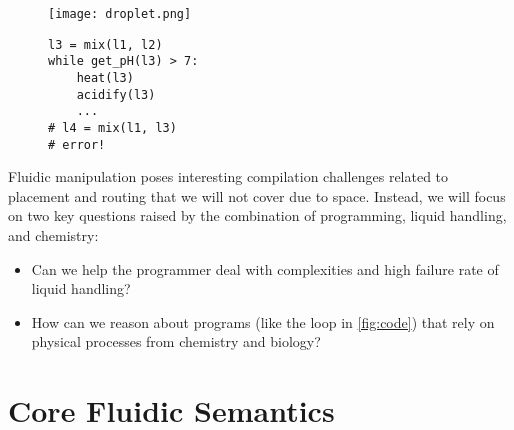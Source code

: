 \documentclass[
  10pt,
  a4paper,
  twocolumn,
]{article}
\begin{document}
\begin{figure}
  \begin{minipage}{0.4\linewidth}
    \footnotesize
    \centering
    \texttt{[image: droplet.png]}
  \end{minipage}
  \hfill
  \begin{minipage}{0.5\linewidth}
    \begin{verbatim}
l3 = mix(l1, l2)
while get_pH(l3) > 7:
    heat(l3)
    acidify(l3)
    ...
# l4 = mix(l1, l3)
# error!
    \end{verbatim}
  \end{minipage}
  \label{fig:board}
  \vspace{-1em}
  \label{fig:code}
\end{figure}

Fluidic manipulation poses interesting compilation challenges related to placement and routing that we will not cover due to space.
Instead, we will focus on two key questions raised by the combination of programming, liquid handling, and chemistry:
\begin{itemize}
\item Can we help the programmer deal with complexities and high failure rate of liquid handling?
\item How can we reason about programs (like the loop in \autoref{fig:code}) that rely on physical processes from chemistry and biology?
\end{itemize}





\section*{Core Fluidic Semantics}
\end{document}
